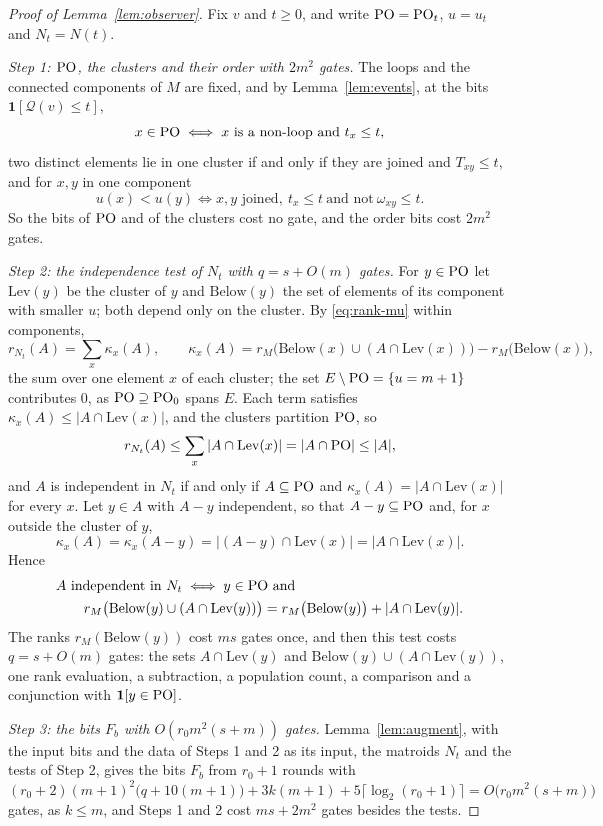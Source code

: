 \begin{proof}[Proof of Lemma~\ref{lem:observer}]
Fix $v$ and $t\ge0$, and write $\mathrm{PO}=\mathrm{PO}_t$, $u=u_t$ and $N_t=N(t)$.

\emph{Step 1: $\mathrm{PO}$, the clusters and their order with $2m^{2}$ gates.}  The loops and the connected components of $M$ are
fixed, and by Lemma~\ref{lem:events}, at the bits $\mathbf 1[\mathcal Q(v)\le t]$,
\[
  x\in\mathrm{PO}\iff x\text{ is a non-loop and }t_x\le t,
\]
two distinct elements lie in one cluster if and only if they are joined and
$T_{xy}\le t$, and for $x,y$ in one component
\[
  u(x)<u(y)\iff x,y\text{ joined},\ t_x\le t\ \text{and not}\ \omega_{xy}\le t.
\]
So the bits of $\mathrm{PO}$ and of the clusters cost no gate, and the order bits cost
$2m^{2}$ gates.

\emph{Step 2: the independence test of $N_t$ with $q=s+O(m)$ gates.}  For $y\in\mathrm{PO}$ let $\mathrm{Lev}(y)$ be the cluster
of $y$ and $\mathrm{Below}(y)$ the set of elements of its component with smaller
$u$; both depend only on the cluster.  By \eqref{eq:rank-mu} within components,
\[
  r_{N_t}(A)=\sum_{x}\kappa_x(A),\qquad
  \kappa_x(A)=r_M\bigl(\mathrm{Below}(x)\cup(A\cap\mathrm{Lev}(x))\bigr)-r_M\bigl(\mathrm{Below}(x)\bigr),
\]
the sum over one element $x$ of each cluster; the set $E\setminus\mathrm{PO}=\{u=m+1\}$
contributes $0$, as $\mathrm{PO}\supseteq\mathrm{PO}_0$ spans $E$.  Each term satisfies
$\kappa_x(A)\le|A\cap\mathrm{Lev}(x)|$, and the clusters partition $\mathrm{PO}$, so
\[
  r_{N_t}(A)\le\sum_x|A\cap\mathrm{Lev}(x)|=|A\cap\mathrm{PO}|\le|A|,
\]
and $A$ is independent in $N_t$ if and only if $A\subseteq\mathrm{PO}$ and
$\kappa_x(A)=|A\cap\mathrm{Lev}(x)|$ for every $x$.  Let $y\in A$ with $A-y$
independent, so that $A-y\subseteq\mathrm{PO}$ and, for $x$ outside the cluster of $y$,
\[
  \kappa_x(A)=\kappa_x(A-y)=|(A-y)\cap\mathrm{Lev}(x)|=|A\cap\mathrm{Lev}(x)|.
\]
Hence
\[
  \begin{aligned}
  &A\text{ independent in }N_t\iff y\in\mathrm{PO}\ \text{and}\\
  &\qquad r_M\bigl(\mathrm{Below}(y)\cup(A\cap\mathrm{Lev}(y))\bigr)
  =r_M\bigl(\mathrm{Below}(y)\bigr)+|A\cap\mathrm{Lev}(y)|.
  \end{aligned}
\]
The ranks $r_M(\mathrm{Below}(y))$ cost $ms$ gates once, and then this test costs
$q=s+O(m)$ gates: the sets $A\cap\mathrm{Lev}(y)$ and
$\mathrm{Below}(y)\cup(A\cap\mathrm{Lev}(y))$, one rank evaluation, a subtraction,
a population count, a comparison and a conjunction with $\mathbf 1[y\in\mathrm{PO}]$.

\emph{Step 3: the bits $F_b$ with $O(r_0m^{2}(s+m))$ gates.}  Lemma~\ref{lem:augment}, with the input bits and
the data of Steps 1 and 2 as its input, the matroids $N_t$ and the tests of Step 2,
gives the bits $F_b$ from $r_0+1$ rounds with
\[
  (r_0+2)(m+1)^{2}\bigl(q+10(m+1)\bigr)+3k(m+1)+5\lceil\log_2(r_0+1)\rceil
  =O\bigl(r_0m^{2}(s+m)\bigr)
\]
gates, as $k\le m$, and Steps 1 and 2 cost $ms+2m^{2}$ gates besides the tests.
\end{proof}

